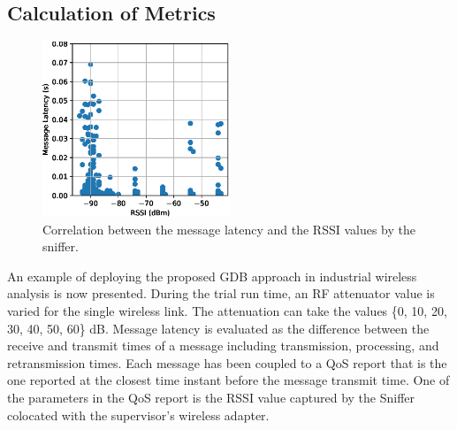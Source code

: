 \subsection{Calculation of Metrics}

\begin{figure}[!ht]
	\centering
	\includegraphics[width=0.5\textwidth]{./chapter-gdb-appl/figures/database/scatter_1.eps}
	\caption{Correlation between the message latency and the RSSI values by the sniffer.}
	\label{gdbappl:fig::database:scatter}
\end{figure}

An example of deploying the proposed GDB approach in industrial wireless analysis is now presented. During the trial run time, an RF attenuator value is varied for the single wireless link. The attenuation can take the values \{0, 10, 20, 30, 40, 50, 60\} dB. Message latency is evaluated as the difference between the receive and transmit times of a message including transmission, processing, and retransmission times. Each message has been coupled to a QoS report that is the one reported at the closest time instant before the message transmit time. One of the parameters in the QoS report is the RSSI value captured by the Sniffer colocated with the supervisor's wireless adapter. 


